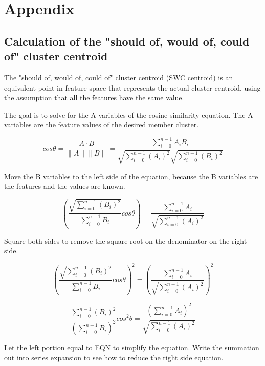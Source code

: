 \documentclass[11pt, onecolumn]{article}
\begin{document}
\section{Appendix}

\subsection{Calculation of the "should of, would of, could of" cluster centroid}

The "should of, would of, could of" cluster centroid (SWC$\_$centroid) is an equivalent point in feature space that represents the actual cluster centroid, using the assumption that all the features have the same value.

The goal is to solve for the A variables of the cosine similarity equation. The A variables are the feature values of the desired member cluster.

\begin{equation}
cos \theta = \frac{A \cdot B }{\|A\| \|B\|} = \frac{\sum^{n-1}_{i=0} A_i B_i}{\sqrt{\sum^{n-1}_{i=0} (A_i)^{2}} \sqrt{\sum^{n-1}_{i=0} (B_i)^{2}} }
\end{equation}

Move the B variables to the left side of the equation, because the B variables are the features and the values are known.

\begin{equation}
\left(  \frac{ \sqrt{\sum^{n-1}_{i=0} (B_i)^{2}} }{ \sum^{n-1}_{i=0} B_i } cos \theta  \right) = \frac{\sum^{n-1}_{i=0} A_i}{\sqrt{\sum^{n-1}_{i=0} (A_i)^{2}} }
\end{equation}

Square both sides to remove the square root on the denominator on the right side.

\begin{equation}
\left(  \frac{ \sqrt{\sum^{n-1}_{i=0} (B_i)^{2}} }{ \sum^{n-1}_{i=0} B_i } cos \theta  \right)^{2} = \left(  \frac{\sum^{n-1}_{i=0} A_i}{\sqrt{\sum^{n-1}_{i=0} (A_i)^{2}} } \right)^{2}
\end{equation}

\begin{equation}
\frac{ \sum^{n-1}_{i=0} (B_i)^{2}} { (\sum^{n-1}_{i=0} B_i)^{2} } cos^{2} \theta  =   \frac{(\sum^{n-1}_{i=0} A_i)^{2} }{\sqrt{\sum^{n-1}_{i=0} (A_i)^{2}} } 
\end{equation}

Let the left portion equal to EQN to simplify the equation. Write the summation out into series expansion to see how to reduce the right side equation.
\end{document}
